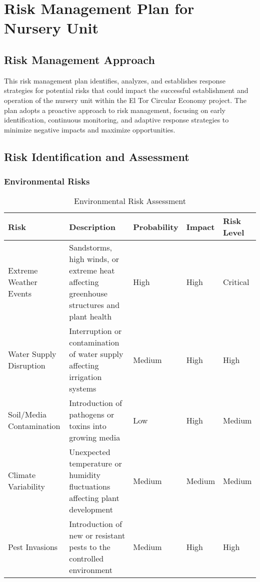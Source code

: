 \section{Risk Management Plan for Nursery Unit}

\subsection{Risk Management Approach}
This risk management plan identifies, analyzes, and establishes response strategies for potential risks that could impact the successful establishment and operation of the nursery unit within the El Tor Circular Economy project. The plan adopts a proactive approach to risk management, focusing on early identification, continuous monitoring, and adaptive response strategies to minimize negative impacts and maximize opportunities.

\subsection{Risk Identification and Assessment}

\subsubsection{Environmental Risks}

\begin{table}[h]
\centering
\begin{tabular}{|p{4cm}|p{4cm}|p{2cm}|p{2cm}|p{3cm}|}
\hline
\textbf{Risk} & \textbf{Description} & \textbf{Probability} & \textbf{Impact} & \textbf{Risk Level} \\
\hline
Extreme Weather Events & Sandstorms, high winds, or extreme heat affecting greenhouse structures and plant health & High & High & Critical \\
\hline
Water Supply Disruption & Interruption or contamination of water supply affecting irrigation systems & Medium & High & High \\
\hline
Soil/Media Contamination & Introduction of pathogens or toxins into growing media & Low & High & Medium \\
\hline
Climate Variability & Unexpected temperature or humidity fluctuations affecting plant development & Medium & Medium & Medium \\
\hline
Pest Invasions & Introduction of new or resistant pests to the controlled environment & Medium & High & High \\
\hline
\end{tabular}
\caption{Environmental Risk Assessment}
\end{table}

